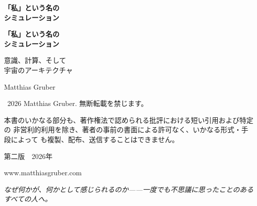 \documentclass[11pt, twoside, openright]{book}
\makeatletter
\def\cleardoublepage{\clearpage\if@twoside \ifodd\c@page\else
  \thispagestyle{empty}\hbox{}\newpage
  \if@twocolumn\hbox{}\newpage\fi\fi\fi}
\makeatother
\begin{document}
\frontmatter
\pagestyle{empty}

\vspace*{3in}
\begin{center}
{\Huge\bfseries 「私」という名の\\[0.3cm]シミュレーション\par}
\end{center}
\cleardoublepage

\vspace*{2in}
\begin{center}
{\Huge\bfseries 「私」という名の\\[0.3cm]シミュレーション\par}
\vspace{0.8cm}
{\Large 意識、計算、そして\\[0.2cm]宇宙のアーキテクチャ\par}
\vspace{2cm}
{\large Matthias Gruber\par}
\end{center}
\clearpage

\thispagestyle{empty}
\vspace*{\fill}
{\small
\noindent \textcopyright\ 2026 Matthias Gruber. 無断転載を禁じます。\par
\vspace{0.5cm}
\noindent 本書のいかなる部分も、著作権法で認められる批評における短い引用および特定の
非営利的利用を除き、著者の事前の書面による許可なく、いかなる形式・手段によって
も複製、配布、送信することはできません。\par
\vspace{0.5cm}

\vspace{0.5cm}
\noindent 第二版　2026年\par
\vspace{0.5cm}
\noindent www.matthiasgruber.com\par
}
\cleardoublepage

\thispagestyle{empty}
\vspace*{3in}
\begin{center}
\textit{なぜ何かが、何かとして感じられるのか——一度でも不思議に思ったことのあるすべての人へ。}
\end{center}
\cleardoublepage

\pagestyle{plain}
\renewcommand{\contentsname}{目次}
\renewcommand{\figurename}{図}
\tableofcontents
\cleardoublepage
\end{document}
